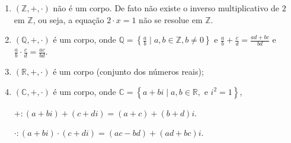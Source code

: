 \begin{example}
	\begin{enumerate}\leavevmode
		\item

		      $\left(\mathbb{Z},+,\cdot\right)$ não é um corpo.
		      De fato não existe o inverso multiplicativo de $2$ em
		      $\mathbb{Z}$, ou seja, a equação $2\cdot x=1$ não se
		      resolue em $\mathbb{Z}$.

		\item

		      $\left(\mathbb{Q},+,\cdot\right)$ é um corpo, onde
		      \begin{math}
			      \mathbb{Q}=
			      \left\{
			      \frac{a}{b}\mid a,b\in\mathbb{Z},b\neq0
			      \right\}
		      \end{math}
		      e $\frac{a}{b}+\frac{c}{d}=\frac{ad+bc}{bd}$ e
		      $\frac{a}{b}\cdot\frac{c}{d}=\frac{ac}{bd}$.

		\item

		      $\left(\mathbb{R},+,\cdot\right)$ é um corpo (conjunto dos
		      números reais);

		\item

		      $\left(\mathbb{C},+,\cdot\right)$ é um corpo, onde
		      \begin{math}
			      \mathbb{C}=
			      \left\{
			      a+bi\mid a,b\in\mathbb{R},\text{ e }i^{2}=1
			      \right\}
		      \end{math},

		      \begin{math}
			      +\colon
			      \left(a+bi\right)+
			      \left(c+di\right)=
			      \left(a+c\right)+
			      \left(b+d\right)i
		      \end{math}.

		      \begin{math}
			      \cdot\colon
			      \left(a+bi\right)\cdot
			      \left(c+di\right)=
			      \left(ac-bd\right)+\left(ad+bc\right)i
		      \end{math}.


\end{enumerate}
\end{example}
